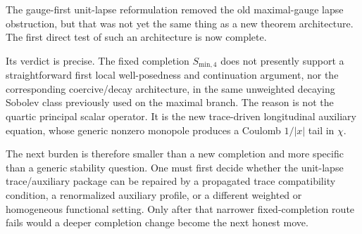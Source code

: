 \documentclass[11pt]{article}
\begin{document}
The gauge-first unit-lapse reformulation removed the old maximal-gauge lapse obstruction, but that was not yet the same thing as a new theorem architecture. The first direct test of such an architecture is now complete.

Its verdict is precise. The fixed completion \(S_{\mathrm{min},4}\) does not presently support a straightforward first local well-posedness and continuation argument, nor the corresponding coercive/decay architecture, in the same unweighted decaying Sobolev class previously used on the maximal branch. The reason is not the quartic principal scalar operator. It is the new trace-driven longitudinal auxiliary equation, whose generic nonzero monopole produces a Coulomb \(1/|x|\) tail in \(\chi\).

The next burden is therefore smaller than a new completion and more specific than a generic stability question. One must first decide whether the unit-lapse trace/auxiliary package can be repaired by a propagated trace compatibility condition, a renormalized auxiliary profile, or a different weighted or homogeneous functional setting. Only after that narrower fixed-completion route fails would a deeper completion change become the next honest move.
\end{document}
